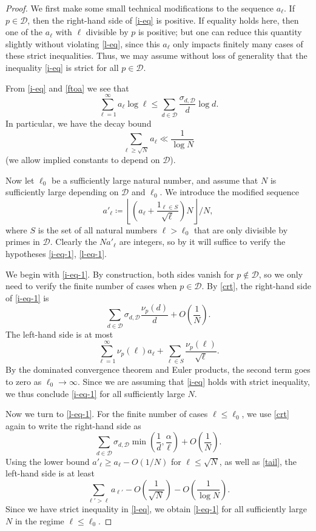 \documentclass[12pt,a4paper,reqno]{amsart}
\numberwithin{equation}{section}
\theoremstyle{plain}
\theoremstyle{definition}
\begin{document}
\begin{proof}  We first make some small technical modifications to the sequence $a_\ell$. If $p \in {\mathcal D}$, then the right-hand side of \eqref{i-eq} is positive.  If equality holds here, then one of the $a_\ell$ with $\ell$ divisible by $p$ is positive; but one can reduce this quantity slightly without violating \eqref{l-eq}, since this $a_\ell$ only impacts finitely many cases of these strict inequalities.  Thus, we may assume without loss of generality that the inequality \eqref{i-eq} is strict for all $p \in {\mathcal D}$.

From \eqref{i-eq} and \eqref{ftoa} we see that
$$ \sum_{\ell=1}^\infty a_\ell \log \ell \leq \sum_{d \in {\mathcal D}} \frac{\sigma_{d,{\mathcal D}}}{d} \log d.$$
In particular, we have the decay bound
\begin{equation}\label{tail}
  \sum_{\ell \geq \sqrt{N}} a_\ell \ll \frac{1}{\log N}
\end{equation}
(we allow implied constants to depend on ${\mathcal D}$).

Now let $\ell_0$ be a sufficiently large natural number, and assume that $N$ is sufficiently large depending on ${\mathcal D}$ and $\ell_0$.  We introduce the modified sequence
$$ a'_\ell \coloneqq \left\lfloor \left(a_\ell + \frac{1_{\ell \in S}}{\sqrt{\ell}}\right) N \right\rfloor / N,$$
where $S$ is the set of all natural numbers $\ell > \ell_0$ that are only divisible by primes in ${\mathcal D}$.
Clearly the $N a'_\ell$ are integers, so by  it will suffice to verify the hypotheses \eqref{i-eq-1}, \eqref{l-eq-1}.

We begin with \eqref{i-eq-1}.  By construction, both sides vanish for $p \not \in {\mathcal D}$, so we only need to verify the finite number of cases when $p \in {\mathcal D}$.  By \eqref{crt}, the right-hand side of \eqref{i-eq-1} is 
$$ \sum_{d \in {\mathcal D}} \sigma_{d,{\mathcal D}} \frac{\nu_p(d)}{d} + O\left(\frac{1}{N} \right).$$
The left-hand side is at most
$$ \sum_{\ell=1}^\infty \nu_p(\ell) a_\ell + \sum_{\ell \in S} \frac{\nu_p(\ell)}{\sqrt{\ell}}.$$
By the dominated convergence theorem and Euler products, the second term goes to zero as $\ell_0 \to \infty$.  Since we are assuming that \eqref{i-eq} holds with strict inequality, we thus conclude \eqref{i-eq-1} for all sufficiently large $N$.

Now we turn to \eqref{l-eq-1}.  For the finite number of cases $\ell \leq \ell_0$, we use \eqref{crt} again to write the right-hand side as
$$ \sum_{d \in {\mathcal D}} \sigma_{d,{\mathcal D}} \min\left( \frac{1}{d}, \frac{\alpha}{\ell}\right) + O\left(\frac{1}{N} \right).$$
Using the lower bound $a'_\ell \geq a_\ell - O(1/N)$ for $\ell \leq \sqrt{N}$, as well as \eqref{tail}, the left-hand side is at least
$$ \sum_{\ell' > \ell} a_{\ell'} - O\left(\frac{1}{\sqrt{N}} \right) - O\left(\frac{1}{\log N} \right).$$
Since we have strict inequality in \eqref{l-eq}, we obtain \eqref{l-eq-1} for all sufficiently large $N$ in the regime $\ell \leq \ell_0$.


\end{proof}
\end{document}
